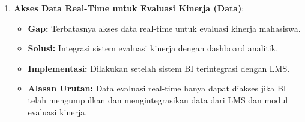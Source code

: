 \begin{enumerate}
	\item \textbf{Akses Data Real-Time untuk Evaluasi Kinerja (Data)}:
	\begin{itemize}
		\item \textbf{Gap:} Terbatasnya akses data real-time untuk evaluasi kinerja mahasiswa.
		\item \textbf{Solusi:} Integrasi sistem evaluasi kinerja dengan dashboard analitik.
		\item \textbf{Implementasi:} Dilakukan setelah sistem BI terintegrasi dengan LMS.
		\item \textbf{Alasan Urutan:} Data evaluasi real-time hanya dapat diakses jika BI telah mengumpulkan dan mengintegrasikan data dari LMS dan modul evaluasi kinerja.
	\end{itemize}
\end{enumerate}


